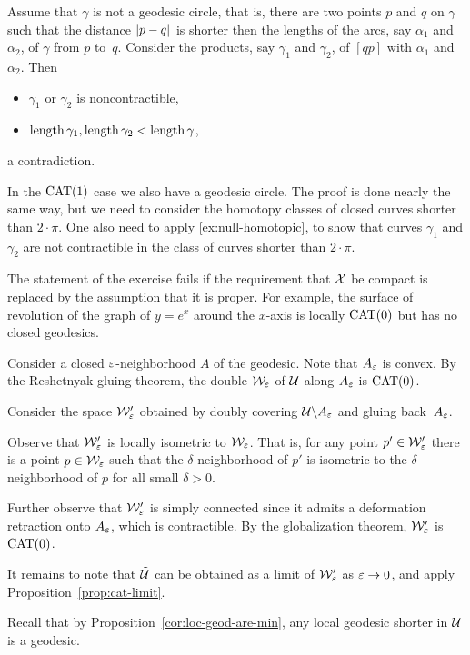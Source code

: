 Assume that $\gamma$ is not a geodesic circle,
that is,  there are two points $p$ and $q$ on $\gamma$ such that the distance $\dist{p}{q}{}$ 
is shorter then the lengths of the arcs, say $\alpha_1$ and $\alpha_2$, of $\gamma$ from $p$ to~$q$.
Consider the products, say $\gamma_1$ and $\gamma_2$,
of $[qp]$ with $\alpha_1$ and~$\alpha_2$.
Then
\begin{itemize}
 \item  $\gamma_1$ or $\gamma_2$ is noncontractible,
 \item $\mathop{\rm length}\nolimits\gamma_1, \mathop{\rm length}\nolimits\gamma_2<\mathop{\rm length}\nolimits \gamma$,
\end{itemize}
a contradiction.

In the $\mathrm{CAT}(1)$ case we also have a geodesic circle.
The proof is done nearly the same way, but we need to consider the homotopy classes of closed curves shorter than $2\cdot \pi$.
One also need to apply \ref{ex:null-homotopic}, to show that curves $\gamma_1$ and $\gamma_2$ are not contractible in the class of curves shorter than $2\cdot \pi$.

The statement of the exercise fails if the requirement that $\mathcal{X}$ be compact is replaced by the assumption that it is proper. For example, the surface of revolution of the graph of $y=e^x$ around the $x$-axis is locally $\mathrm{CAT}(0)$ but has no closed geodesics.


Consider a closed $\varepsilon$-neighborhood $A$ of the geodesic.
Note that $A_\varepsilon$ is convex.
By the Reshetnyak gluing theorem, the double $\mathcal{W}_\varepsilon$ of $\mathcal{U}$ along $A_\varepsilon$ is $\mathrm{CAT}(0)$.

Consider the space $\mathcal{W}'_\varepsilon$ obtained by doubly covering $\mathcal{U}\backslash A_\varepsilon$ and gluing back~$A_\varepsilon$.

Observe that $\mathcal{W}'_\varepsilon$ is locally isometric to $\mathcal{W}_\varepsilon$. 
That is, for any point $p'\in\mathcal{W}'_\varepsilon$ there is a point $p\in\mathcal{W}_\varepsilon$ such that the $\delta$-neighborhood of $p'$ is isometric to the $\delta$-neighborhood of $p$ for all small $\delta>0$.

Further observe that $\mathcal{W}'_\varepsilon$ is simply connected since it admits a deformation retraction onto $A_\varepsilon$, which is contractible.
By the globalization theorem, $\mathcal{W}'_\varepsilon$ is $\mathrm{CAT}(0)$.

It remains to note that $\tilde {\mathcal{U}}$ can be obtained as a limit of $\mathcal{W}'_\varepsilon$ as $\varepsilon\to 0$, and apply Proposition~\ref{prop:cat-limit}.

Recall that by Proposition~\ref{cor:loc-geod-are-min}, any local geodesic shorter in $\mathcal{U}$ is a geodesic.

